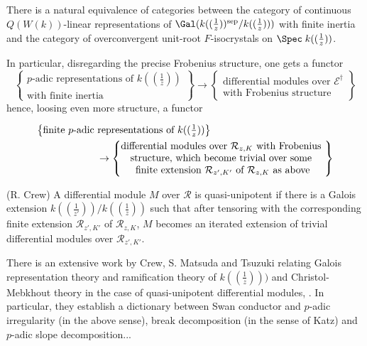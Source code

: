 \begin{thm}\label{thm::3.3.3} There is a natural equivalence of
 categories between the category of continuous $Q(W(k))$-linear 
 representations of
 $\Gal(k((\frac{1}{z}))^{\mathrm{sep}}/k((\frac{1}{z})))$ with 
 {\rm finite inertia} and the category of overconvergent unit-root
 $F$-isocrystals on $\Spec\;k((\frac{1}{z}))$.
\end{thm}

\par\noindent In particular, disregarding the precise Frobenius
structure, one gets a functor
\begin{equation*}
 \left\{\begin{matrix}
    \text{$p$-adic representations of $k((\frac{1}{z}))$}\\
    \text{with finite inertia}
   \end{matrix}
   \right\}
   \to
   \left\{\begin{matrix}
      \text{differential modules over $\mathcal{E}^\dagger$}\\
      \text{with Frobenius structure}
     \end{matrix}
     \right\}
\end{equation*}
hence, loosing even more structure, a functor

\begin{align*}
 &\bigl\{\begin{matrix}
	 \text{finite $p$-adic representations of $k((\frac{1}{z}))$}
	\end{matrix}\bigr\}\\
 &\qquad\qquad\qquad \to
 \left\{
 \begin{matrix}
  \text{differential modules over $ \mathcal{R}_{z,K}$ with Frobenius
  }\\
  \text{structure, which become trivial over some 
  }\\
  \text{finite extension $\mathcal{R}_{z',K'}$ of $\mathcal{R}_{z,K}$ as above}
 \end{matrix}
 \right\}
\end{align*}

\begin{dfn}\label{def::3.3.4} (R. Crew) A differential module $M$ over
$\mathcal{R}$ is {\rm quasi-unipotent} if there is a Galois extension
$k((\frac{1}{z'}))/k((\frac{1}{z}))$ such that after tensoring with the
corresponding finite extension $\mathcal{R}_{z',K'}$ of
$\mathcal{R}_{z,K} $, $M$ becomes an iterated extension of trivial
differential modules over $\mathcal{R}_{z',K'}$.

 There is an
 extensive work by Crew, S. Matsuda and Tsuzuki relating Galois
 representation theory and ramification theory of $k((\frac{1}{z})))$ and
 Christol-Mebkhout theory in the case of quasi-unipotent differential
 modules, \cf \cite{ceiatsc}.  In particular, they 
 establish a dictionary between Swan conductor and $p$-adic irregularity
 (in the above sense), break decomposition (in the sense of Katz) and
 $p$-adic slope decomposition... 
\end{dfn}

